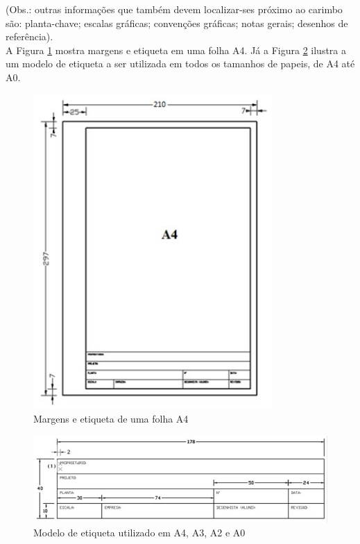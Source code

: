 \documentclass{article}
\begin{document}
(Obs.: outras informações que também devem localizar-ses próximo ao carimbo são: planta-chave; escalas gráficas; convenções gráficas; notas gerais; desenhos de referência).\\

\hspace{1cm} A Figura \ref{fig_MargensEtiquetaA4} mostra margens e etiqueta em uma folha A4. Já a Figura \ref{fig_ModeloEtiquetaA4ateA0} ilustra a um modelo de etiqueta a ser utilizada em todos os tamanhos de papeis, de A4 até A0.

\begin{figure} [H] %
\centering
\includegraphics[scale=1.1]{Fig/Figura_MargensEtiquetaA4.png} 
\caption{Margens e etiqueta de uma folha A4}
\label{fig_MargensEtiquetaA4}
\end{figure}

\begin{figure} [H] %
\centering
\includegraphics[scale=0.8]{Fig/Figura_ModeloEtiquetaA4ateA0.png} 
\caption{Modelo de etiqueta utilizado em A4, A3, A2 e A0}
\label{fig_ModeloEtiquetaA4ateA0}
\end{figure}
    
\end{document}
